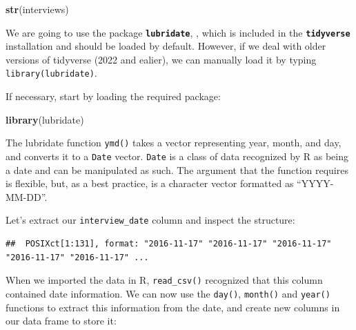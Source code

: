 \documentclass[
]{article}
\newenvironment{Shaded}{\begin{snugshade}}{\end{snugshade}}
\newcommand{\FunctionTok}[1]{\textcolor[rgb]{0.13,0.29,0.53}{\textbf{#1}}}
\newcommand{\NormalTok}[1]{#1}
\newcommand{\OtherTok}[1]{\textcolor[rgb]{0.56,0.35,0.01}{#1}}
\newcommand{\SpecialCharTok}[1]{\textcolor[rgb]{0.81,0.36,0.00}{\textbf{#1}}}
\begin{document}
\begin{Shaded}
\begin{Highlighting}[]
\FunctionTok{str}\NormalTok{(interviews)}
\end{Highlighting}
\end{Shaded}

We are going to use the package \textbf{\texttt{lubridate}}, , which is
included in the \textbf{\texttt{tidyverse}} installation and should be
loaded by default. However, if we deal with older versions of tidyverse
(2022 and ealier), we can manually load it by typing
\texttt{library(lubridate)}.

If necessary, start by loading the required package:

\begin{Shaded}
\begin{Highlighting}[]
\FunctionTok{library}\NormalTok{(lubridate)}
\end{Highlighting}
\end{Shaded}

The lubridate function \texttt{ymd()} takes a vector representing year,
month, and day, and converts it to a \texttt{Date} vector. \texttt{Date}
is a class of data recognized by R as being a date and can be
manipulated as such. The argument that the function requires is
flexible, but, as a best practice, is a character vector formatted as
``YYYY-MM-DD''.

Let's extract our \texttt{interview\_date} column and inspect the
structure:

\begin{Shaded}
\end{Shaded}

\begin{verbatim}
##  POSIXct[1:131], format: "2016-11-17" "2016-11-17" "2016-11-17" "2016-11-17" "2016-11-17" ...
\end{verbatim}

When we imported the data in R, \texttt{read\_csv()} recognized that
this column contained date information. We can now use the
\texttt{day()}, \texttt{month()} and \texttt{year()} functions to
extract this information from the date, and create new columns in our
data frame to store it:

\begin{Shaded}
\end{Shaded}
\end{document}
